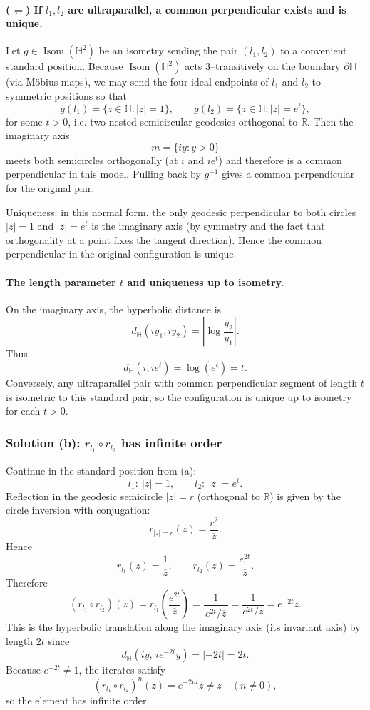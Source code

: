 \documentclass[12pt,a4paper]{article}
\newcommand{\hyp}{\mathbb{H}}
\newcommand{\R}{\mathbb{R}}
\DeclareMathOperator{\Isom}{Isom}
\newcommand{\HH}{\mathbb{H}}
\theoremstyle{plain}
\theoremstyle{definition}      %
\begin{document}
	\paragraph{($\Leftarrow$) If $l_1,l_2$ are ultraparallel, a common perpendicular exists and is unique.}
	Let $g\in\Isom(\HH^2)$ be an isometry sending the pair $(l_1,l_2)$ to a convenient standard position.
	Because $\Isom(\HH^2)$ acts $3$–transitively on the boundary $\partial\HH$ (via Möbius maps),
	we may send the four ideal endpoints of $l_1$ and $l_2$ to symmetric positions so that
	\[
	g(l_1)=\{z\in\HH:|z|=1\},\qquad g(l_2)=\{z\in\HH:|z|=e^t\},
	\]
	for some $t>0$, i.e. two nested semicircular geodesics orthogonal to $\R$.
	Then the imaginary axis
	\[
	m=\{iy:y>0\}
	\]
	meets both semicircles orthogonally (at $i$ and $ie^t$) and therefore is a common perpendicular in this model.
	Pulling back by $g^{-1}$ gives a common perpendicular for the original pair.
	
	Uniqueness: in this normal form, the only geodesic perpendicular to both circles $|z|=1$ and $|z|=e^t$ is the
	imaginary axis (by symmetry and the fact that orthogonality at a point fixes the tangent direction).
	Hence the common perpendicular in the original configuration is unique.
	
	\paragraph{The length parameter $t$ and uniqueness up to isometry.}
	On the imaginary axis, the hyperbolic distance is
	\[
	d_{\hyp}(iy_1,iy_2)=\left|\log\frac{y_2}{y_1}\right|.
	\]
	Thus
	\[
	d_{\hyp}(i,ie^t)=\log(e^t)=t.
	\]
	Conversely, any ultraparallel pair with common perpendicular segment of length $t$ is isometric to this standard pair,
	so the configuration is unique up to isometry for each $t>0$.
	
	\subsubsection*{Solution (b): $r_{l_1}\circ r_{l_2}$ has infinite order}
	
	Continue in the standard position from (a):
	\[
	l_1:\ |z|=1,\qquad l_2:\ |z|=e^t.
	\]
	Reflection in the geodesic semicircle $|z|=r$ (orthogonal to $\R$) is given by the circle inversion with conjugation:
	\[
	r_{|z|=r}(z)=\frac{r^2}{\overline{z}}.
	\]
	Hence
	\[
	r_{l_1}(z)=\frac{1}{\overline{z}},\qquad r_{l_2}(z)=\frac{e^{2t}}{\overline{z}}.
	\]
	Therefore
	\[
	(r_{l_1}\circ r_{l_2})(z)
	= r_{l_1}\!\left(\frac{e^{2t}}{\overline{z}}\right)
	= \frac{1}{\overline{\,e^{2t}/\overline{z}\,}}
	= \frac{1}{e^{2t}/z}
	= e^{-2t}z.
	\]
	This is the hyperbolic translation along the imaginary axis (its invariant axis) by length $2t$ since
	\[
	d_{\hyp}(iy,\,i e^{-2t}y)=|{-2t}|=2t.
	\]
	Because $e^{-2t}\neq 1$, the iterates satisfy
	\[
	(r_{l_1}\circ r_{l_2})^n(z)=e^{-2nt}z\neq z\quad(n\neq 0),
	\]
	so the element has infinite order.
	
\end{document}
